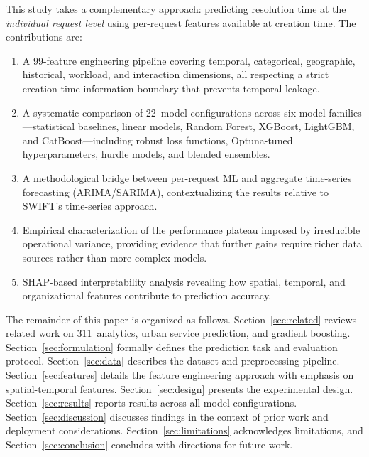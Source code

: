 \documentclass[sigconf,nonacm]{acmart}
\begin{document}
This study takes a complementary approach: predicting resolution
time at the \emph{individual request level} using per-request
features available at creation time. The contributions are:

\begin{enumerate}[leftmargin=*,nosep]
\item A 99-feature engineering pipeline covering temporal,
      categorical, geographic, historical, workload, and
      interaction dimensions, all respecting a strict
      creation-time information boundary that prevents
      temporal leakage.
\item A systematic comparison of 22~model configurations
      across six model families---statistical baselines, linear
      models, Random Forest, XGBoost, LightGBM, and
      CatBoost---including robust loss functions, Optuna-tuned
      hyperparameters, hurdle models, and blended ensembles.
\item A methodological bridge between per-request ML and
      aggregate time-series forecasting (ARIMA/SARIMA),
      contextualizing the results relative to SWIFT's
      time-series approach.
\item Empirical characterization of the performance plateau
      imposed by irreducible operational variance, providing
      evidence that further gains require richer data sources
      rather than more complex models.
\item SHAP-based interpretability analysis revealing how spatial,
      temporal, and organizational features contribute to
      prediction accuracy.
\end{enumerate}

The remainder of this paper is organized as follows.
Section~\ref{sec:related} reviews related work on 311~analytics,
urban service prediction, and gradient boosting.
Section~\ref{sec:formulation} formally defines the prediction
task and evaluation protocol. Section~\ref{sec:data} describes
the dataset and preprocessing pipeline. Section~\ref{sec:features}
details the feature engineering approach with emphasis on
spatial-temporal features. Section~\ref{sec:design} presents the
experimental design. Section~\ref{sec:results} reports results
across all model configurations. Section~\ref{sec:discussion}
discusses findings in the context of prior work and deployment
considerations. Section~\ref{sec:limitations} acknowledges
limitations, and Section~\ref{sec:conclusion} concludes with
directions for future work.

\end{document}
